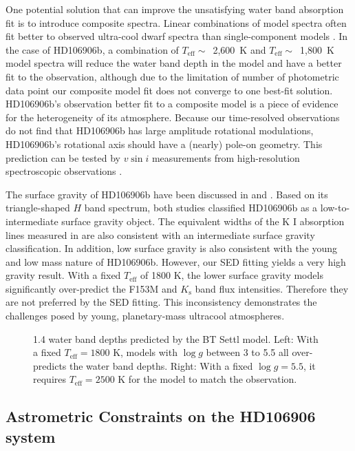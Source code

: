 \documentclass[twocolumn]{aastex62}
\newcommand{\teff}{\ensuremath{T_{\mathrm{eff}}}\xspace}
\newcommand{\editHL}[1]{{\color{blue}#1}}
\begin{document}
\editHL{One potential solution that can improve the unsatisfying water band absorption fit is to introduce composite spectra. Linear combinations of model spectra often fit better to observed ultra-cool dwarf spectra than single-component models \citep[e.g.,][]{Marley2010,Apai2013}. In the case of HD106906b, a combination of $\teff\sim$~2,600~K and $\teff\sim$~1,800~K model spectra will reduce the water band depth in the model and have a better fit to the observation, although due to the limitation of number of photometric data point our composite model fit does not converge to one best-fit solution. HD106906b's observation better fit to a composite model is a piece of evidence for the heterogeneity of its atmosphere. Because our time-resolved observations do not find that HD106906b has large amplitude rotational modulations, HD106906b's rotational axis should have a (nearly) pole-on geometry. This prediction can be tested by $v\sin i$ measurements from high-resolution spectroscopic observations \citep[e.g.,][]{Snellen2014,Vos2017b,Bryan2018}.}

 The surface gravity of HD106906b have been discussed in \citet{Bailey2013} and \citet{Daemgen2017}.  Based on its triangle-shaped $H$ band spectrum, both studies classified HD106906b as a low-to-intermediate surface gravity object. The equivalent widths of the K I absorption lines measured in \citet{Daemgen2017} are also consistent with an intermediate surface gravity classification. In addition, low surface gravity is also consistent with the young and low mass nature of HD106906b. However, our SED fitting yields a very high gravity result. With a fixed $T_{\mathrm{eff}}$ of 1800 K, the lower surface gravity models significantly over-predict the F153M and $K_{\mathrm{s}}$ band flux intensities. Therefore they are not preferred by the SED fitting. This inconsistency demonstrates the challenges posed by young, planetary-mass ultracool atmospheres.

\begin{figure}
  \centering
  \caption{1.4 \micron{} water band depths predicted by the BT Settl model. Left: With a fixed $T_{\mathrm{eff}}=1800$ K, models with $\log g$ between 3 to 5.5 all over-predicts the water band depths. Right: With a fixed $\log g=5.5$, it requires $T_{\mathrm{eff}}=2500$ K for the model to match the observation.}
  \label{fig:waterdepth}
\end{figure}

\subsection{Astrometric Constraints on the  HD106906 system}
\end{document}
